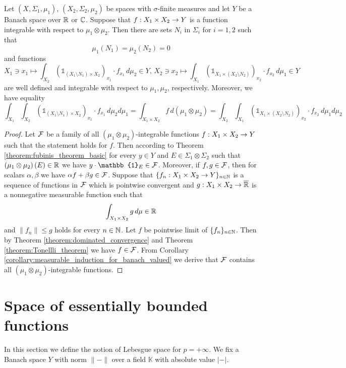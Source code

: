 \begin{theorem}[Fubini]\label{theorem:fubini}
Let $(X,\Sigma_1,\mu_1)$, $(X_2,\Sigma_2,\mu_2)$ be spaces with $\sigma$-finite measures and let $Y$ be a Banach space over ${\mathbb R}$ or ${\mathbb C}$. Suppose that $f:X_1\times X_2\rightarrow Y$ is a function integrable with respect to $\mu_1\otimes \mu_2$. Then there are sets $N_i$ in $\Sigma_i$ for $i=1,2$ such that
$$\mu_1(N_1) = \mu_2(N_2) = 0$$ 
and functions
$$X_1 \ni x_1\mapsto \int_{X_2}\left(\mathbb{1}_{\left(X_1\setminus N_1\right)\times X_2}\right)_{x_1}\cdot f_{x_1}\,d\mu_2\in Y,\,X_2 \ni x_2\mapsto \int_{X_1}\left(\mathbb{1}_{X_1\times \left(X_2\setminus N_2\right)}\right)_{x_2}\cdot f_{x_2}\,d\mu_1\in Y$$
are well defined and integrable with respect to $\mu_1, \mu_2$, respectively. Moreover, we have equality
$$\int_{X_1}\int_{X_2} \left(\mathbb{1}_{\left(X_1\setminus N_1\right)\times X_2}\right)_{x_1}\cdot f_{x_1}\,d\mu_2d\mu_1 = \int_{X_1\times X_2}f\,d(\mu_1\otimes \mu_2) = \int_{X_2}\int_{X_1} \left(\mathbb{1}_{X_1\times \left(X_2\setminus N_2\right)}\right)_{x_2}\cdot f_{x_2}\,d\mu_1d\mu_2$$
\end{theorem}
\begin{proof}
Let ${\mathcal F}$ be a family of all $\left(\mu_1\otimes \mu_2\right)$-integrable functions $f:X_1\times X_2\rightarrow Y$ such that the statement holds for $f$. Then according to Theorem \ref{theorem:fubinis_theorem_basic} for every $y\in Y$ and $E\in \Sigma_1\otimes \Sigma_2$ such that $\left(\mu_1\otimes \mu_2\right)(E) \in {\mathbb R}$ we have $y\cdot \mathbb{1}_E \in \cF$. Moreover, if $f, g\in {\mathcal F}$, then for scalars $\alpha,\beta$ we have $\alpha f + \beta g\in {\mathcal F}$. Suppose that $\{f_n:X_1\times X_2\rightarrow Y\}_{n\in {\mathbb N}}$ is a sequence of functions in ${\mathcal F}$ which is pointwise convergent and $g:X_1\times X_2\rightarrow \overline{{\mathbb R}}$ is a nonnegative measurable function such that
$$\int_{X_1\times X_2}g\,d\mu \in {\mathbb R}$$
and $\lVert f_n\rVert \leq g$ holds for every $n\in {\mathbb N}$. Let $f$ be pointwise limit of $\{f_n\}_{n\in {\mathbb N}}$. Then by Theorem \ref{theorem:dominated_convergence} and Theorem \ref{theorem:Tonellli_theorem} we have $f\in {\mathcal F}$. From Corollary \ref{corollary:measurable_induction_for_banach_valued} we derive that ${\mathcal F}$ contains all $\left(\mu_1\otimes \mu_2\right)$-integrable functions.
\end{proof}

\section{Space of essentially bounded functions}
\noindent
In this section we define the notion of Lebesgue space for $p = +\infty$. We fix a Banach space $Y$ with norm $\lVert-\rVert$ over a field $\mathbb{K}$ with absolute value $|-|$.

